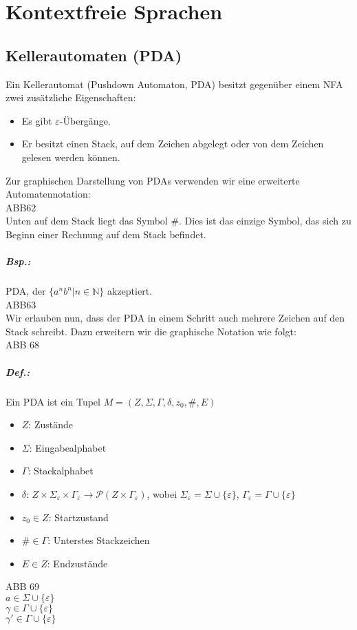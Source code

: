 \section{Kontextfreie Sprachen}

\subsection{Kellerautomaten (PDA)}
Ein Kellerautomat (Pushdown Automaton, PDA) besitzt gegenüber einem NFA zwei zusätzliche Eigenschaften:
\begin{itemize}
\item Es gibt $\varepsilon$-Übergänge.
\item Er besitzt einen Stack, auf dem Zeichen abgelegt oder von dem Zeichen gelesen werden können.
\end{itemize}
Zur graphischen Darstellung von PDAs verwenden wir eine erweiterte Automatennotation:\\
ABB62\\
Unten auf dem Stack liegt das Symbol \#. Dies ist das einzige Symbol, das sich zu Beginn einer Rechnung auf dem Stack befindet.
\subparagraph{Bsp.:} PDA, der $\{a^nb^n|n\in \mathbb{N}\}$ akzeptiert.\\
ABB63\\
Wir erlauben nun, dass der PDA in einem Schritt auch mehrere Zeichen auf den Stack schreibt. Dazu erweitern wir die graphische Notation wie folgt:\\
ABB 68
\subparagraph{Def.:} Ein PDA ist ein Tupel $M=(Z,\Sigma, \Gamma, \delta, z_0, \#, E)$
\begin{itemize}
\item $Z$: Zustände
\item $\Sigma$: Eingabealphabet
\item $\Gamma$: Stackalphabet
\item $\delta$: $Z\times \Sigma_\varepsilon \times \Gamma_\varepsilon \to \mathcal{P}(Z\times \Gamma_\varepsilon)$, wobei $\Sigma_\varepsilon=\Sigma \cup \{\varepsilon\}$, $\Gamma_\varepsilon = \Gamma \cup \{\varepsilon\}$
\item $z_0\in Z$: Startzustand
\item $\# \in \Gamma$: Unterstes Stackzeichen
\item $E \in Z$: Endzustände
\end{itemize}
ABB 69\\
$a \in \Sigma \cup \{\varepsilon\}$\\
$\gamma \in \Gamma \cup \{\varepsilon\}$\\
$\gamma' \in \Gamma \cup \{\varepsilon\}$

